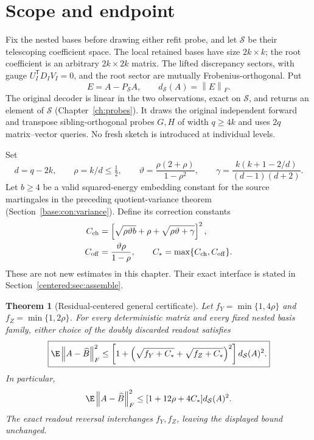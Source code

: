 \documentclass[11pt,oneside,openany,a4paper]{book}
\numberwithin{equation}{chapter}
\newtheorem{theorem}{Theorem}[chapter]
\theoremstyle{definition}
\theoremstyle{remark}
\newcommand{\F}[1]{\left\lVert#1\right\rVert_F}
\begin{document}
\section{Scope and endpoint}
Fix the nested bases before drawing either refit probe, and let $\mathcal S$ be their telescoping coefficient space. The local retained bases have size $2k\times k$; the root coefficient is an arbitrary $2k\times2k$ matrix. The lifted discrepancy sectors, with gauge $U_I^{\mathsf T}D_IV_I=0$, and the root sector are mutually Frobenius-orthogonal. Put
\[
 E=A-P_{\mathcal S}A,\qquad d_{\mathcal S}(A)=\F E.
\]
The original decoder is linear in the two observations, exact on $\mathcal S$, and returns an element of $\mathcal S$ (Chapter~\ref{ch:probes}). It draws the original independent forward and transpose sibling-orthogonal probes $G,H$ of width $q\ge4k$ and uses $2q$ matrix--vector queries. No fresh sketch is introduced at individual levels.

Set
\begin{equation}\label{centered:eq:parameters}
 d=q-2k,\qquad \rho=k/d\le\tfrac12,\qquad
 \vartheta=\frac{\rho(2+\rho)}{1-\rho^2},\qquad
 \gamma=\frac{k(k+1-2/d)}{(d-1)(d+2)}.
\end{equation}
Let $b\ge4$ be a valid squared-energy embedding constant for the source martingales in the preceding quotient-variance theorem (Section~\ref{base:con:variance}). Define its correction constants
\begin{align}
 C_{\rm ch}&=\left[\sqrt{\rho\vartheta b}+\rho+\sqrt{\rho\vartheta+\gamma}\right]^2,\label{centered:eq:chain}\\
 C_{\rm off}&=\frac{\vartheta\rho}{1-\rho},\qquad
 C_*=\max\{C_{\rm ch},C_{\rm off}\}.\label{centered:eq:cstar}
\end{align}
These are not new estimates in this chapter. Their exact interface is stated in Section~\ref{centered:sec:assemble}.

\begin{theorem}[Residual-centered general certificate]\label{centered:thm:main}
Let $f_Y=\min\{1,4\rho\}$ and $f_Z=\min\{1,2\rho\}$. For every deterministic matrix and every fixed nested basis family, either choice of the doubly discarded readout satisfies
\begin{equation}\label{centered:eq:main}
 \boxed{\E\F{A-\widehat B}^2
 \le\left[1+\left(\sqrt{f_Y+C_*}+\sqrt{f_Z+C_*}\right)^2\right]
 d_{\mathcal S}(A)^2.}
\end{equation}
In particular,
\begin{equation}\label{centered:eq:simple}
 \E\F{A-\widehat B}^2\le[1+12\rho+4C_*]d_{\mathcal S}(A)^2.
\end{equation}
The exact readout reversal interchanges $f_Y,f_Z$, leaving the displayed bound unchanged.
\end{theorem}
\end{document}
